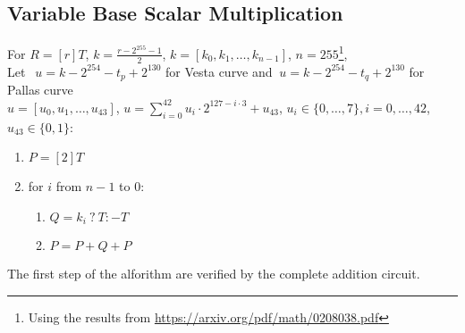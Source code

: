 \subsection{Variable Base Scalar Multiplication}
For $R  = [r]T$, $k = \frac{r - 2^{255} - 1}{2}$, $k = [k_0, k_1, \dots, k_{n - 1}]$, $n = 255$\footnote{Using the results from \url{https://arxiv.org/pdf/math/0208038.pdf}}, \\
Let $~~u=k- 2^{254} - t_p+2^{130}$ for Vesta curve and $~u=k- 2^{254} - t_q+2^{130}$ for Pallas curve\\ 
$u = [u_0, u_1, \dots, u_{43}]$, $u=\sum_{i=0}^{42}u_i\cdot 2^{127-i \cdot 3} + u_{43}$, $u_i \in \{0,\dots, 7\}, i=0,\dots, 42$, $u_{43} \in \{0,1\}$:
\begin{enumerate}
    \item $P = [2]T$
    \item for $i$ from $n - 1$ to $0$:
    \begin{enumerate}
        \item $Q = k_{i} \: ? \: T : -T$
        \item $P = P + Q + P$
    \end{enumerate}
\end{enumerate}

The first step of the alforithm are verified by the complete addition circuit.


